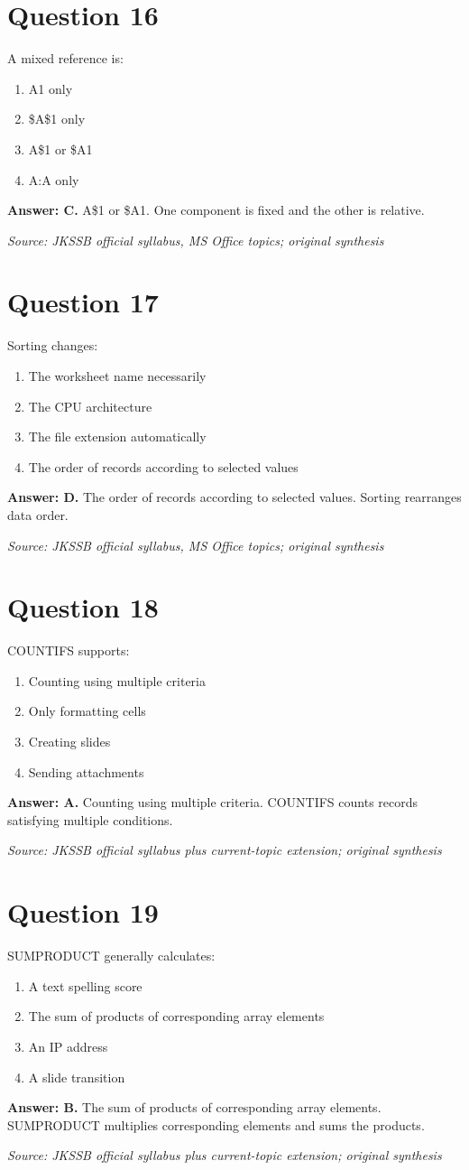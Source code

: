 \documentclass[11pt,a4paper]{book}
\newcommand{\source}[1]{\par\smallskip\textit{Source: #1}}
\newcommand{\answer}[2]{\par\textbf{Answer: #1.} #2}
\begin{document}
\section*{Question 16}
A mixed reference is:
\begin{enumerate}[label=\Alph*.]
\item A1 only
\item \$A\$1 only
\item A\$1 or \$A1
\item A:A only
\end{enumerate}
\answer{C}{A\$1 or \$A1. One component is fixed and the other is relative.}
\source{JKSSB official syllabus, MS Office topics; original synthesis}
\section*{Question 17}
Sorting changes:
\begin{enumerate}[label=\Alph*.]
\item The worksheet name necessarily
\item The CPU architecture
\item The file extension automatically
\item The order of records according to selected values
\end{enumerate}
\answer{D}{The order of records according to selected values. Sorting rearranges data order.}
\source{JKSSB official syllabus, MS Office topics; original synthesis}
\section*{Question 18}
COUNTIFS supports:
\begin{enumerate}[label=\Alph*.]
\item Counting using multiple criteria
\item Only formatting cells
\item Creating slides
\item Sending attachments
\end{enumerate}
\answer{A}{Counting using multiple criteria. COUNTIFS counts records satisfying multiple conditions.}
\source{JKSSB official syllabus plus current-topic extension; original synthesis}
\section*{Question 19}
SUMPRODUCT generally calculates:
\begin{enumerate}[label=\Alph*.]
\item A text spelling score
\item The sum of products of corresponding array elements
\item An IP address
\item A slide transition
\end{enumerate}
\answer{B}{The sum of products of corresponding array elements. SUMPRODUCT multiplies corresponding elements and sums the products.}
\source{JKSSB official syllabus plus current-topic extension; original synthesis}
\end{document}

